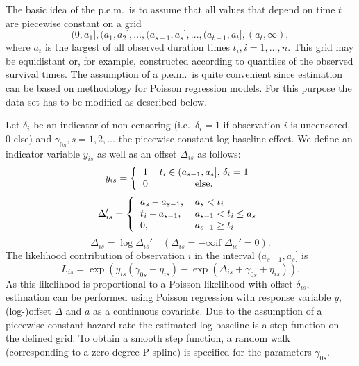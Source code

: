 \documentclass[11pt,a4paper,twoside]{bayesxarticle}
\begin{document}
The basic idea of the p.e.m.~is to assume that all values that
depend on time $t$ are piecewise constant on a grid
\[
(0,a_1],(a_1,a_2],\ldots,(a_{s-1},a_s],\ldots,(a_{t-1},a_t],(a_t,\infty),
\]
where $a_t$ is the largest of all observed duration times
$t_i,i=1,\ldots,n$. This grid may be equidistant or, for example,
constructed according to quantiles of the observed survival times.
The assumption of a p.e.m.~is quite convenient since estimation can
be based on methodology for Poisson regression models. For this
purpose the data set has to be modified as described below.

Let $\delta_i$ be an indicator of non-censoring (i.e.~$\delta_i=1$
if observation $i$ is uncensored, 0 else) and
$\gamma_{0s},s=1,2,\ldots$ the piecewise constant log-baseline
effect. We define an indicator variable $y_{is}$ as well as an
offset $\Delta_{is}$ as follows:
\[
y_{is}=\left\{
 \begin{tabular}{cc}
1 & $t_i\in (a_{s-1},a_s]$, $\delta_i=1$\\0 & else.
 \end{tabular}
 \right.
\]
\vspace{0.05cm}
\[
\Delta_{is}'=\left\{\begin{tabular}{ll} $a_s-a_{s-1}$,&$a_s<t_i$ \\ $t_i-a_{s-1}$,&$a_{s-1}<t_i\le a_s$ \\
0, &$a_{s-1}\ge t_i$
\end{tabular}\right.
\]
\[
\Delta_{is}=\log{\Delta_{is}'} \quad (\Delta_{is}=-\infty \textrm{
if } \Delta_{is}'=0).
\]
The likelihood contribution of observation $i$ in the interval
$(a_{s-1},a_s]$ is
\[
L_{is}=\exp\left(y_{is}(\gamma_{0s}+\eta_{is})-\exp(\Delta_{is}+\gamma_{0s}+\eta_{is})\right).
\]
As this likelihood is proportional to a Poisson likelihood with
offset $\delta_{is}$, estimation can be performed using Poisson
regression with response variable $y$, (log-)offset $\Delta$ and $a$
as a continuous covariate. Due to the assumption of a piecewise
constant hazard rate the estimated log-baseline is a step function
on the defined grid. To obtain a smooth step function, a random walk
(corresponding to a zero degree P-spline) is specified for the
parameters $\gamma_{0s}$.
\end{document}
